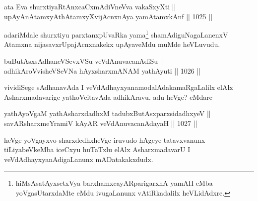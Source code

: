 \begin{shl}
ata Eva shurxti\footnotemark[2] yaRtAnxcaCxmAdiVneVva vakaSxyXti || \\
upAyAnAtamxyAthAtamxyXvijAcnxnAya yamAtamxkAnf \hfill || 1025 ||  
\end{shl}

\begin{artha}
adariMdale shurxtiyu parxtanxpUvaRka yama\footnote{hiMsAsatAyxsetxVya barxhamxcayAR\s parigarxhA yamAH eMba yoVgasUtarxdaMte eMdu ivugaLanunx vAtiRkadalilx heVLidAdxre.} shamAdiguNagaLanenxV Atamxna nijasavxrUpajAcnxnakekx upAyaveMdu muMde heVLuvudu.
\end{artha}


\begin{shl}
buButAsxsAdhaneVSevxVSu veVdAnuvacanAdiSu || \\
adhikAroV\s visheVSeVNa hAyxsharxmANAM \footnotemark[1]yathAyuti \hfill || 1026 ||  
\end{shl}

\begin{artha}
vividiSege sAdhanavAda I veVdAdhayxyanamodalAdakamaRgaLalilx elAlx Asharxmadavarige yathoVcitavAda adhikAravu. adu heVge? eMdare
\end{artha}

\begin{shl}
yathAyoVgaM yathAsharxdadhxM tadubxButAsxparxsidadhxyeV || \\
savARsharxmeYramiV kAyAR veVdAnuvacanAdayaH \hfill || 1027 ||  
\end{shl}

\begin{artha}
heVge yoVgayxvo sharxdedhxheVge iruvudo hAgeye tatavxvanunx tiLiyabeVkeMba iceCxyu huTaTxlu elAlx AsharxmadavarU I veVdAdhayxyanAdigaLanunx mADatakakxdudx.
\end{artha}


